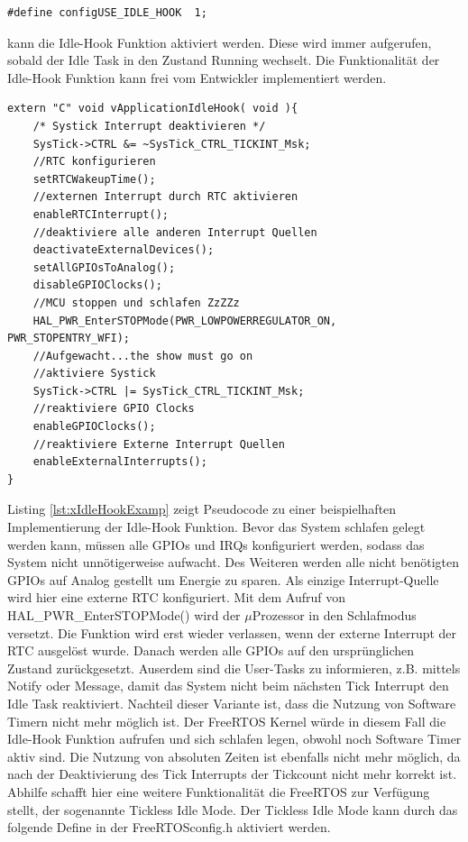\begin{lstlisting}[label=lst:defineIdleHook, numbers = none]
#define configUSE_IDLE_HOOK  1; 
\end{lstlisting}
kann die Idle-Hook Funktion aktiviert werden. Diese wird immer aufgerufen, sobald der Idle Task in den Zustand Running wechselt. Die Funktionalität der Idle-Hook Funktion kann frei vom Entwickler implementiert werden. 
\begin{lstlisting}[caption={Pseudocode für eine Idle-Hook Funktion},captionpos=b, label=lst:xIdleHookExamp, float=hbt!]
extern "C" void vApplicationIdleHook( void ){
	/* Systick Interrupt deaktivieren */
	SysTick->CTRL &= ~SysTick_CTRL_TICKINT_Msk;
	//RTC konfigurieren
	setRTCWakeupTime();
	//externen Interrupt durch RTC aktivieren
	enableRTCInterrupt();
	//deaktiviere alle anderen Interrupt Quellen
	deactivateExternalDevices();
	setAllGPIOsToAnalog(); 
	disableGPIOClocks();
	//MCU stoppen und schlafen ZzZZz
	HAL_PWR_EnterSTOPMode(PWR_LOWPOWERREGULATOR_ON, PWR_STOPENTRY_WFI); 
	//Aufgewacht...the show must go on
	//aktiviere Systick
	SysTick->CTRL |= SysTick_CTRL_TICKINT_Msk;
	//reaktiviere GPIO Clocks
	enableGPIOClocks();
	//reaktiviere Externe Interrupt Quellen
	enableExternalInterrupts();	
}
\end{lstlisting}
\newline  %
Listing \ref{lst:xIdleHookExamp} zeigt Pseudocode zu einer beispielhaften Implementierung der Idle-Hook Funktion. Bevor das System schlafen gelegt werden kann, müssen alle GPIOs und IRQs konfiguriert werden, sodass das System nicht unnötigerweise aufwacht. Des Weiteren werden alle nicht benötigten GPIOs auf Analog gestellt um Energie zu sparen. Als einzige Interrupt-Quelle wird hier eine externe RTC konfiguriert. Mit dem Aufruf von HAL\_PWR\_EnterSTOPMode() wird der $\mu$\-Pro\-zesso\-r in den Schlafmodus versetzt. Die Funktion wird erst wieder verlassen, wenn der externe Interrupt der RTC ausgelöst wurde. Danach werden alle GPIOs auf den ursprünglichen Zustand zurückgesetzt. Auserdem sind die User-Tasks zu informieren, z.B. mittels Notify oder Message, damit das System nicht beim nächsten Tick Interrupt den Idle Task reaktiviert. Nachteil dieser Variante ist, dass die Nutzung von Software Timern nicht mehr möglich ist. Der FreeRTOS Kernel würde in diesem Fall die Idle-Hook Funktion aufrufen und sich schlafen legen, obwohl noch Software Timer aktiv sind. Die Nutzung von absoluten Zeiten ist ebenfalls nicht mehr möglich, da nach der Deaktivierung des Tick Interrupts der Tickcount nicht mehr korrekt ist. Abhilfe schafft hier eine weitere Funktionalität die FreeRTOS zur Verfügung stellt, der sogenannte Tickless Idle Mode. Der Tickless Idle Mode kann durch das folgende Define in der FreeRTOSconfig.h aktiviert werden.  
